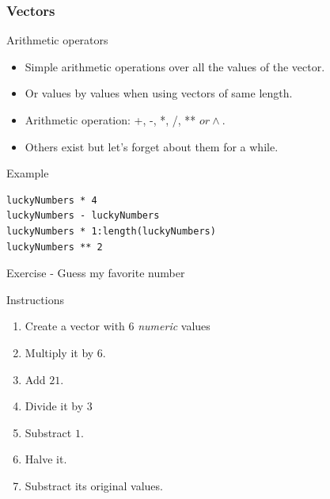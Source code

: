 \documentclass[10pt]{beamer}
\newenvironment{xframe}[2][]
  {\begin{frame}[fragile,environment=xframe,#1]
  \frametitle{#2}}
  {\end{frame}}
\begin{document}

\begin{xframe}{Vectors}
  \begin{block}{Arithmetic operators}
    \begin{itemize}
    \item Simple arithmetic operations over all the values of the {\sf vector}.
    \item Or values by values when using {\sf vector}s of same length.
    \item Arithmetic operation: +, -, *, /, ** \(or \wedge\).
    \item Others exist but let's forget about them for a while.
    \end{itemize}
  \end{block}
\begin{exampleblock}{Example}
\begin{verbatim}
luckyNumbers * 4
luckyNumbers - luckyNumbers
luckyNumbers * 1:length(luckyNumbers)
luckyNumbers ** 2
\end{verbatim}
  \end{exampleblock}
\end{xframe}


\begin{frame}{Exercise - Guess my favorite number}
  \begin{block}{Instructions}
    \begin{enumerate}
    \item Create a {\sf vector} with 6 {\it numeric} values
    \item Multiply it by $6$.
    \item Add $21$.
    \item Divide it by $3$ 
    \item Substract $1$.
    \item Halve it.
    \item Substract its original values.
    \end{enumerate}
  \end{block}
\end{frame}


\end{document}
